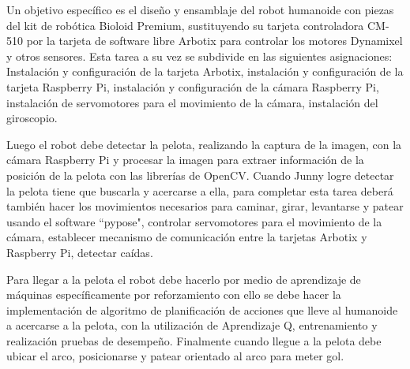 

Un objetivo espec\'ifico es el diseño y ensamblaje del robot humanoide con piezas del kit de robótica Bioloid Premium, sustituyendo su tarjeta controladora CM-510 \cite{cm510} por la tarjeta de software libre Arbotix para controlar los motores Dynamixel y otros sensores. Esta tarea a su vez se subdivide en las siguientes asignaciones: Instalación y configuración de la tarjeta Arbotix, instalación y configuración de la tarjeta Raspberry Pi, instalación y configuración de la cámara Raspberry Pi, instalación de servomotores  para el movimiento de la cámara, instalación del giroscopio. 

Luego el robot debe detectar la pelota, realizando la captura de la imagen, con la cámara Raspberry Pi y procesar la imagen para extraer información de la posición de la pelota con las librerías de OpenCV. Cuando Junny logre detectar la pelota tiene que buscarla y acercarse a ella, para completar esta tarea deber\'a tambi\'en hacer los movimientos necesarios para caminar, girar, levantarse y patear usando el software ``pypose", controlar servomotores para el movimiento de la cámara, establecer mecanismo de comunicación entre la tarjetas Arbotix y Raspberry Pi, detectar ca\'idas. 


Para llegar a la pelota el robot debe hacerlo por medio de aprendizaje de m\'aquinas específicamente por reforzamiento con ello se debe hacer la implementación de algoritmo de planificación de acciones que lleve al humanoide a acercarse a la pelota, con la utilizaci\'on de Aprendizaje Q, entrenamiento y realizaci\'on pruebas de desempe\~no. Finalmente cuando llegue a la pelota debe ubicar el arco, posicionarse y patear orientado al arco para meter gol. 
    
